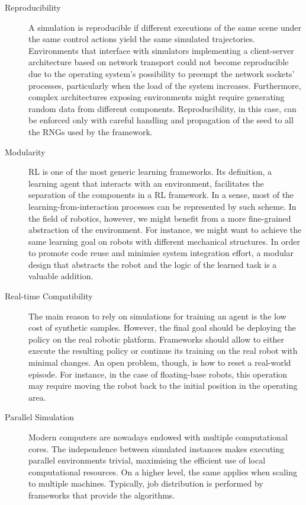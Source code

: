 \begin{description}
%
\item[Reproducibility]
%
A simulation is reproducible if different executions of the same scene under the same control actions yield the same simulated trajectories.
Environments that interface with simulators implementing a client-server architecture based on network transport could not become reproducible due to the operating system's possibility to preempt the network sockets' processes, particularly when the load of the system increases.
Furthermore, complex architectures exposing environments might require generating random data from different components.
Reproducibility, in this case, can be enforced only with careful handling and propagation of the seed to all the \acp{RNG} used by the framework.
%
\item[Modularity]
%
\acl{RL} is one of the most generic learning frameworks.
Its definition, a learning agent that interacts with an environment, facilitates the separation of the components in a \ac{RL} framework.
In a sense, most of the learning-from-interaction processes can be represented by such scheme.
In the field of robotics, however, we might benefit from a more fine-grained abstraction of the environment.
For instance, we might want to achieve the same learning goal on robots with different mechanical structures.
In order to promote code reuse and minimise system integration effort, a modular design that abstracts the robot and the logic of the learned task is a valuable addition.
%
\item[Real-time Compatibility]
%
The main reason to rely on simulations for training an agent is the low cost of synthetic samples.
However, the final goal should be deploying the policy on the real robotic platform.
Frameworks should allow to either execute the resulting policy or continue its training on the real robot with minimal changes.
An open problem, though, is how to reset a real-world episode.
For instance, in the case of floating-base robots, this operation may require moving the robot back to the initial position in the operating area.
%
\item[Parallel Simulation]
%
Modern computers are nowadays endowed with multiple computational cores.
The independence between simulated instances makes executing parallel environments trivial,
maximising the efficient use of local computational resources.
On a higher level, the same applies when scaling to multiple machines.
Typically, job distribution is performed by frameworks that provide the algorithms.

\end{description}
